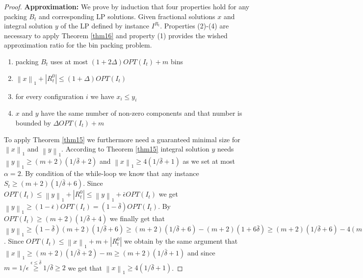 \documentclass[a4paper,11pt]{article}
\newcommand{\nor}[1]{\left\|#1\right\|}
\begin{document}
\begin{proof}
	{\bf Approximation:} We prove by induction that four properties hold for any packing $B_t$
	and corresponding LP solutions. Given fractional solutions
	$x$ and integral solution $y$ of the LP defined by instance $I^{R_t}$. 
	Properties (2)-(4) are
	necessary to apply Theorem \ref{thm16} and property (1) provides the wished approximation ratio for the bin packing problem.
	\begin{enumerate}
		\item packing $B_t$ uses at most $(1+ 2\Delta)\mathit{OPT}(I_t) +m$ bins
		\item $\nor{x}_1 + |R_{t}^0|  \leq (1+ \Delta) \mathit{OPT}(I_t)$
		\item for every configuration $i$ we have $x_i \leq y_i$
		\item $x$ and $y$ have the same number of non-zero components and that number is bounded by 
		$\Delta \mathit{OPT}(I_t) +m$
	\end{enumerate}
	To apply Theorem \ref{thm15} we furthermore need a guaranteed minimal size for $\nor{x}_1$ and $\nor{y}_1$.
	According to Theorem \ref{thm15} integral solution $y$ needs $\nor{y}_1 \geq (m+2)(1/ \bar{\delta} +2)$ and 
	$\nor{x}_1 \geq 4 (1/ \bar{\delta} +1)$ as we set at most $\alpha = 2$.
	By condition of the while-loop we know that any instance $S_t \geq (m+2)(1/ \bar{\delta} +6)$. 
	Since $\mathit{OPT}(I_t) \leq \nor{y}_1 + |R_{t}^0| \leq \nor{y}_1 + \bar{\epsilon} \mathit{OPT}(I_t)$ we get
	$\nor{y}_1 \geq (1-\bar{\epsilon})\mathit{OPT}(I_t) = (1-\bar{\delta})\mathit{OPT}(I_t)$. 
	By $\mathit{OPT}(I_t) \geq (m+2)(1/ \bar{\delta} +4)$ we
	finally get that $\nor{y}_1 \geq (1-\bar{\delta}) (m+2)(1/ \bar{\delta} +6) \geq 
	(m+2)(1/ \bar{\delta} +6) - (m+2)(1 + 6\bar{\delta}) \geq (m+2)(1/ \bar{\delta} +6) - 4(m+2) = 
	(m+2)(1/ \bar{\delta} +2)$. Since $\mathit{OPT}(I_t) \leq \nor{x}_1 + m + |R_{t}^0|$ we obtain by the same argument
	that $\nor{x}_1 \geq (m+2)(1/ \bar{\delta} +2) -m \geq (m+2)(1/ \bar{\delta} +1)$ and since $m = 1/\epsilon 
	\stackrel{\epsilon \leq \bar{\delta}}{\geq} 1/ \bar{\delta}
	\geq 2$ we get that $\nor{x}_1 \geq 4 (1/ \bar{\delta} +1)$.
	

\end{proof}
\end{document}
